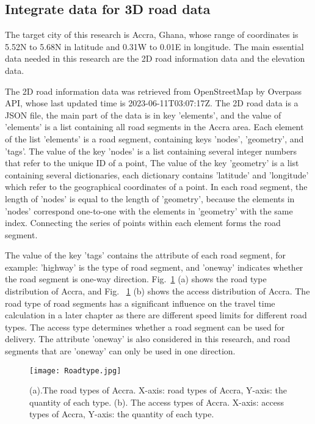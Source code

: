 \documentclass[final-report]{report-template}
\begin{document}
\subsection {Integrate data for 3D road data}
The target city of this research is Accra, Ghana, whose range of coordinates is 5.52N to 5.68N in latitude and 0.31W to 0.01E in longitude.
The main essential data needed in this research are the 2D road information data and the elevation data. 

The 2D road information data was retrieved from OpenStreetMap by Overpass API, whose last updated time is 2023-06-11T03:07:17Z.
The 2D road data is a JSON file, the main part of the data is in key 'elements', and the value of 'elements' is a list containing all road segments in the Accra area.
Each element of the list 'elements' is a road segment, containing keys 'nodes', 'geometry', and 'tags'. 
The value of the key 'nodes' is a list containing several integer numbers that refer to the unique ID of a point, 
The value of the key 'geometry' is a list containing several dictionaries, each dictionary contains 'latitude' and 'longitude' which refer to the geographical coordinates of a point.
In each road segment, the length of 'nodes' is equal to the length of 'geometry', because the elements in 'nodes' correspond one-to-one with the elements in 'geometry' with the same index.
Connecting the series of points within each element forms the road segment.

The value of the key 'tags' contains the attribute of each road segment, for example: 'highway' is the type of road segment, and 'oneway' indicates whether the road segment is one-way direction.
Fig.~\ref{fig:accra_road} (a) shows the road type distribution of Accra, and Fig.~ \ref{fig:accra_road} (b) shows the access distribution of Accra. 
The road type of road segments has a significant influence on the travel time calculation in a later chapter as there are different speed limits for different road types.
The access type determines whether a road segment can be used for delivery. The attribute 'oneway' is also considered in this research, and road segments that are 'oneway' can only be used in one direction.
\begin{figure}[H]
    \centering
    \texttt{[image: Roadtype.jpg]}
    \caption{\label{fig:accra_road} (a).The road types of Accra. X-axis: road types of Accra, Y-axis: the quantity of each type. (b). The access types of Accra. X-axis: access types of Accra, Y-axis: the quantity of each type.}
\end{figure}
\end{document}
